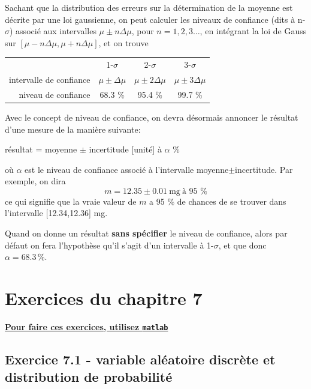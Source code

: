 Sachant que la distribution des erreurs sur la détermination de la moyenne est décrite par une loi gaussienne, on peut calculer les niveaux de confiance (dits à n-$\sigma$) associé aux intervalles $\mu\pm n\Delta\mu$, pour $n=1,2,3\dots$, en intégrant la loi de Gauss sur $[\mu-n\Delta\mu,\mu+n\Delta\mu]$, et on trouve
\begin{center}
\begin{tabular}{r|ccc}
 & 1-$\sigma$ & 2-$\sigma$ & 3-$\sigma$ \\
intervalle de confiance & $\mu\pm\Delta\mu$ & $\mu\pm2\Delta\mu$ & $\mu\pm3\Delta\mu$ \\
niveau de confiance & 68.3 \% & 95.4 \% & 99.7 \%
\end{tabular}
\end{center}

Avec le concept de niveau de confiance, on devra désormais annoncer le résultat d'une mesure de la manière suivante:
\begin{center}
résultat = moyenne $\pm$ incertitude [unité] à $\alpha$ \%
\end{center}
où $\alpha$ est le niveau de confiance associé à l'intervalle moyenne$\pm$incertitude. Par exemple, on dira
$$
m=12.35\pm0.01\ \text{mg}\ \text{à 95 \%}
$$
ce qui signifie que la vraie valeur de $m$ a 95 \% de chances de se trouver dans l'intervalle [12.34,12.36] mg.

Quand on donne un résultat \textbf{sans spécifier} le niveau de confiance, alors par défaut on fera l'hypothèse qu'il s'agit d'un intervalle à 1-$\sigma$, et que donc $\alpha=68.3\,\%$.

\newpage

\section{Exercices du chapitre 7}

\begin{center}
\Large \bf {\underline{Pour faire ces exercices, utilisez \texttt{matlab}}}
\end{center}

\subsection*{Exercice 7.1 - variable aléatoire discrète et distribution de probabilité}

